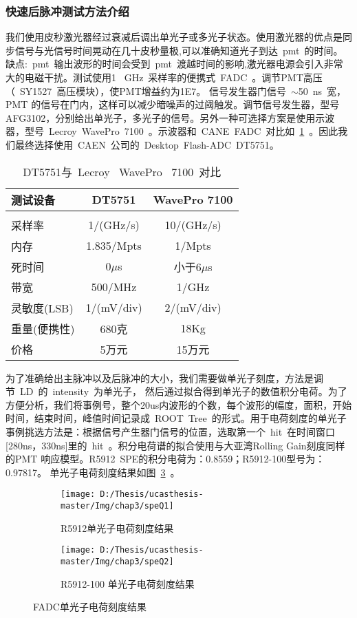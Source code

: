 \subsubsection{快速后脉冲测试方法介绍}
我们使用皮秒激光器经过衰减后调出单光子或多光子状态。使用激光器的优点是同步信号与光信号时间晃动在几十皮秒量极,可以准确知道光子到达~pmt~的时间。缺点:~pmt~输出波形的时间会受到~pmt~渡越时间的影响,激光器电源会引入非常大的电磁干扰。测试使用1 ~GHz~采样率的便携式~FADC~。调节PMT高压（~SY1527~高压模块），使PMT增益约为1E7。 信号发生器门信号~$\sim$50~ns~宽，PMT 的信号在门内，这样可以减少暗噪声的过阈触发。调节信号发生器，型号AFG3102，分别给出单光子，多光子的信号。另外一种可选择方案是使用示波器，型号~Lecroy~WavePro~7100~。示波器和~CANE~FADC~对比如~\ref{tab:dtwa}~。因此我们最终选择使用~CAEN~公司的~Desktop~Flash-ADC~DT5751。
\begin{table}[htbp]
\centering  %
\begin{tabular}{lcc}  %
\hline
测试设备 &DT5751 &WavePro 7100 \\ \hline
\\  采样率&1/(GHz/s) &10/(GHz/s)
\\  内存 &1.835/Mpts &1/Mpts
\\  死时间& 0$\mu$s &小于6$\mu$s
\\   带宽 &500/MHz &1/GHz
\\   灵敏度(LSB)&1/(mV/div)& 2/(mV/div)
\\  重量(便携性)& 680克 & 18Kg
\\ 价格& 5万元& 15万元
\\ \hline
\end{tabular}
\caption{DT5751与~Lecroy~ WavePro ~7100~对比}
\label{tab:dtwa}
\end{table}
为了准确给出主脉冲以及后脉冲的大小，我们需要做单光子刻度，方法是调节~LD~的~intensity~为单光子， 然后通过拟合得到单光子的数值积分电荷。为了方便分析，我们将事例号，整个20us内波形的个数，每个波形的幅度，面积，开始时间，结束时间，峰值时间记录成~ROOT~Tree~的形式。用于电荷刻度的单光子事例挑选方法是：根据信号产生器门信号的位置，选取第一个~hit~在时间窗口[280ns，330ns]里的~hit~。积分电荷谱的拟合使用与大亚湾Rolling Gain刻度同样的PMT 响应模型。R5912~SPE的积分电荷为：0.8559；R5912-100型号为：0.97817。 单光子电荷刻度结果如图~\ref{fig:speQ}~。
\begin{figure}[!htb]
  \centering
  \begin{subfigure}[b]{\MySubFactor\textwidth}
    \texttt{[image: D:/Thesis/ucasthesis-master/Img/chap3/speQ1]}
    \caption{R5912单光子电荷刻度结果}
    \label{fig:speQ_1}
  \end{subfigure}%
  \quad\quad\quad\quad%
  \begin{subfigure}[b]{\MySubFactor\textwidth}
    \texttt{[image: D:/Thesis/ucasthesis-master/Img/chap3/speQ2]}
    \caption{R5912-100 单光子电荷刻度结果}
    \label{fig:speQ_2}
  \end{subfigure}
  \caption{FADC单光子电荷刻度结果}
  \label{fig:speQ}
\end{figure}

